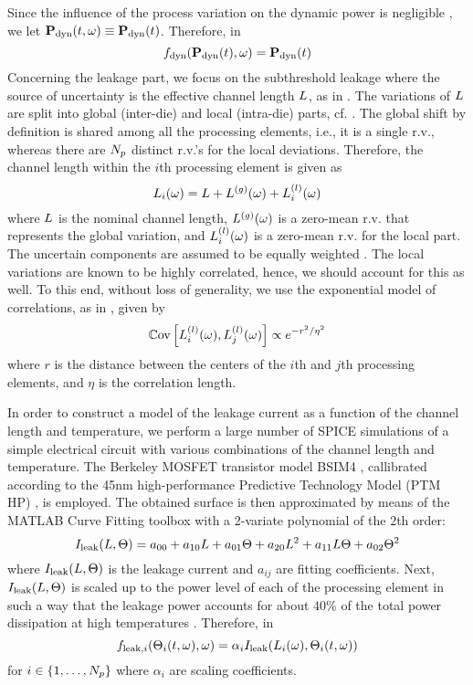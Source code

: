Since the influence of the process variation on the dynamic power is negligible \cite{juan2012, srivastava2010}, we let $\mathbf{P}_{\text{dyn}}(t, \omega) \equiv \mathbf{P}_{\text{dyn}}(t)$. Therefore, in 
\[
  f_{\text{dyn}}(\mathbf{P}_{\text{dyn}}(t), \omega) = \mathbf{P}_{\text{dyn}}(t)
\]
Concerning the leakage part, we focus on the subthreshold leakage where the source of uncertainty is the effective channel length $L$, as in \cite{juan2012}. The variations of $L$ are split into global (inter-die) and local (intra-die) parts, cf. \cite{juan2012, srivastava2010, shen2009}. The global shift by definition is shared among all the processing elements, i.e., it is a single r.v., whereas there are ${N_p}$ distinct r.v.'s for the local deviations. Therefore, the channel length within the $i$th processing element is given as
\[
  L_i(\omega) = L + {L^{(g)}}(\omega) + L^{(l)}_i(\omega)
\]
where $L$ is the nominal channel length, ${L^{(g)}}(\omega)$ is a zero-mean r.v. that represents the global variation, and $L^{(l)}_i(\omega)$ is a zero-mean r.v. for the local part. The uncertain components are assumed to be equally weighted \cite{juan2012}. The local variations are known to be highly correlated, hence, we should account for this as well. To this end, without loss of generality, we use the exponential model of correlations, as in \cite{shen2009}, given by
\begin{equation} \elabel{covariance}
  \oCov{\lLeff_i(\o), \lLeff_j(\o)} \propto e^{-r^2/\eta^2}
\end{equation}
where $r$ is the distance between the centers of the $i$th and $j$th processing elements, and $\eta$ is the correlation length.

In order to construct a model of the leakage current as a function of the channel length and temperature, we perform a large number of SPICE simulations of a simple electrical circuit with various combinations of the channel length and temperature. The Berkeley MOSFET transistor model BSIM4 \cite{bsim4}, callibrated according to the 45nm high-performance Predictive Technology Model (PTM HP) \cite{ptm}, is employed. The obtained surface is then approximated by means of the MATLAB Curve Fitting toolbox \cite{matlab} with a 2-variate polynomial of the $2$th order:
\[
  I_{\text{leak}}(L, \Theta) = a_{00} + a_{10} L + a_{01} \Theta + a_{20} L^2 + a_{11} L \Theta + a_{02} \Theta^2
\]
where $I_{\text{leak}}(L, \Theta)$ is the leakage current and $a_{ij}$ are fitting coefficients. Next, $I_{\text{leak}}(L, \Theta)$ is scaled up to the power level of each of the processing element in such a way that the leakage power accounts for about $40\%$ of the total power dissipation at high temperatures \cite{liu2007}. Therefore, in 
\[
  f_{\text{leak}, i}(\Theta_i(t, \omega), \omega) = \alpha_i I_{\text{leak}}(L_i(\omega), \Theta_i(t, \omega))
\]
for $i \in \{ 1, \dotsc, {N_p} \}$ where $\alpha_i$ are scaling coefficients.
